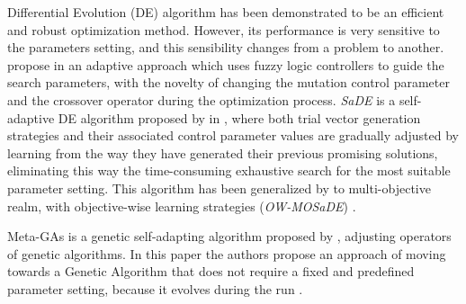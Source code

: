 Differential Evolution (DE) algorithm has been demonstrated to be an efficient and robust optimization method. However, its performance is very sensitive to the parameters setting, and this sensibility changes from a problem to another.  propose in \cite{Liu2005} an adaptive approach which uses fuzzy logic controllers to guide the search parameters, with the novelty of changing the mutation control parameter and the crossover operator during the optimization process. \textit{SaDE} is a self-adaptive DE algorithm proposed by  in \cite{Qin2009}, where both trial vector generation strategies and their associated control parameter values are gradually adjusted by learning from the way they have generated their previous promising solutions, eliminating this way the time-consuming exhaustive search for the most suitable parameter setting. This algorithm has been generalized by  to multi-objective realm, with objective-wise learning strategies (\textit{OW-MOSaDE}) \cite{Huang2009}.

{\sc Meta-GAs} is a genetic self-adapting algorithm proposed by , adjusting operators of genetic algorithms. In this paper the authors propose an approach of moving towards a Genetic Algorithm that does not require a fixed and predefined parameter setting, because it evolves during the run \cite{Clune2005}.